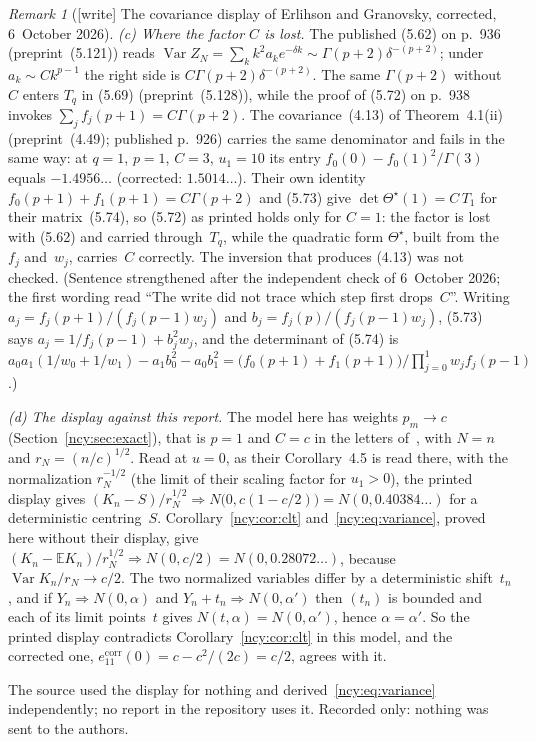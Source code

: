\documentclass[11pt,letterpaper]{article}
\numberwithin{equation}{section}
\theoremstyle{remark}\newtheorem{remark}[theorem]{Remark}
\newcommand{\EE}{\mathbb E}
\newcommand{\Var}{\operatorname{Var}}
\theoremstyle{definition}\newtheorem{definition}[theorem]{Definition}\theoremstyle{plain}
\begin{document}
\begin{remark}[{[write]} The covariance display of Erlihson and Granovsky, corrected, 6~October 2026]
\emph{(c) Where the factor $C$ is lost.} The published (5.62) on p.~936
(preprint~(5.121)) reads
$\operatorname{Var}Z_N=\sum_kk^2a_ke^{-\delta k}\sim\Gamma(p+2)\delta^{-(p+2)}$;
under $a_k\sim Ck^{p-1}$ the right side is $C\Gamma(p+2)\delta^{-(p+2)}$.
The same $\Gamma(p+2)$ without~$C$ enters $T_q$ in (5.69) (preprint~(5.128)),
while the proof of (5.72) on p.~938 invokes
$\sum_jf_j(p+1)=C\Gamma(p+2)$. The covariance~(4.13) of Theorem~4.1(ii)
(preprint~(4.49); published p.~926) carries the same denominator and fails
in the same way: at $q=1$, $p=1$, $C=3$, $u_1=10$ its
entry $f_0(0)-f_0(1)^2/\Gamma(3)$ equals $-1.4956\ldots$ (corrected:
$1.5014\ldots$). Their own identity $f_0(p+1)+f_1(p+1)=C\Gamma(p+2)$ and
(5.73) give $\det\Theta^\star(1)=C\,T_1$ for their matrix~(5.74), so (5.72) as
printed holds only for $C=1$: the factor is lost with (5.62) and carried
through~$T_q$, while the quadratic form $\Theta^\star$, built from the $f_j$
and~$w_j$, carries~$C$ correctly. The inversion that produces (4.13) was not
checked. \textup{(Sentence strengthened after the independent check of
6~October 2026; the first wording read ``The write did not trace which step
first drops~$C$''. Writing $a_j=f_j(p+1)/(f_j(p-1)w_j)$ and
$b_j=f_j(p)/(f_j(p-1)w_j)$, (5.73) says $a_j=1/f_j(p-1)+b_j^2w_j$, and the
determinant of (5.74) is
$a_0a_1(1/w_0+1/w_1)-a_1b_0^2-a_0b_1^2
=\bigl(f_0(p+1)+f_1(p+1)\bigr)/\prod_{j=0}^{1}w_jf_j(p-1)$.)}

\emph{(d) The display against this report.} The model here has weights
$p_m\to c$ (Section~\ref{ncy:sec:exact}), that is $p=1$ and $C=c$ in the
letters of~\cite{eg2008}, with $N=n$ and $r_N=(n/c)^{1/2}$. Read at $u=0$, as
their Corollary~4.5 is read there, with the normalization $r_N^{-1/2}$ (the
limit of their scaling factor for $u_1>0$), the printed display gives
$(K_n-S)/r_N^{1/2}\Rightarrow N\bigl(0,c(1-c/2)\bigr)=N(0,0.40384\ldots)$ for
a deterministic centring~$S$. Corollary~\ref{ncy:cor:clt}
and~\eqref{ncy:eq:variance}, proved here without their display, give
$(K_n-\EE K_n)/r_N^{1/2}\Rightarrow N(0,c/2)=N(0,0.28072\ldots)$, because
$\Var K_n/r_N\to c/2$. The two normalized variables differ by a deterministic
shift~$t_n$, and if $Y_n\Rightarrow N(0,\alpha)$ and $Y_n+t_n\Rightarrow
N(0,\alpha')$ then $(t_n)$ is bounded and each of its limit points~$t$ gives
$N(t,\alpha)=N(0,\alpha')$, hence $\alpha=\alpha'$. So the printed display
contradicts Corollary~\ref{ncy:cor:clt} in this model, and the corrected one,
$e^{\mathrm{corr}}_{11}(0)=c-c^2/(2c)=c/2$, agrees with it.

The source used the display for nothing and derived~\eqref{ncy:eq:variance}
independently; no report in the repository uses it. Recorded only: nothing
was sent to the authors.
\end{remark}
\end{document}
